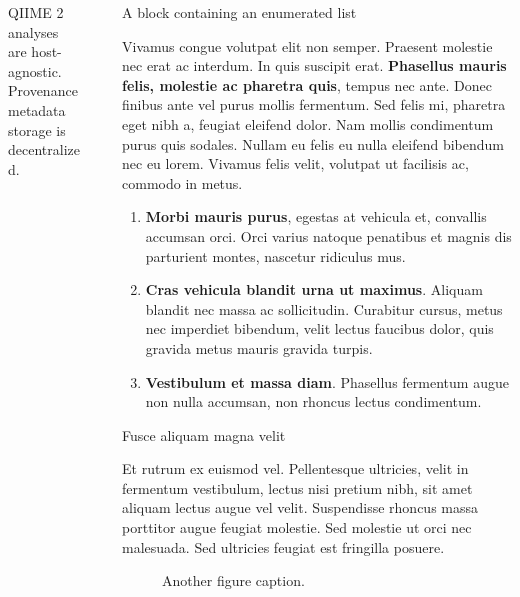 \documentclass[final]{beamer}
\newlength{\sepwidth}
\newlength{\colwidth}
\newcommand{\separatorcolumn}{\begin{column}{\sepwidth}\end{column}}
\begin{document}
\begin{frame}[t]
\begin{columns}[t]
\begin{column}{\colwidth}
\begin{block}{QIIME 2 analyses are host-agnostic. Provenance metadata storage is decentralized.}
  \end{block}

\end{column}

\separatorcolumn

\begin{column}{\colwidth}

  \begin{block}{A block containing an enumerated list}

    Vivamus congue volutpat elit non semper. Praesent molestie nec erat ac
    interdum. In quis suscipit erat. \textbf{Phasellus mauris felis, molestie
    ac pharetra quis}, tempus nec ante. Donec finibus ante vel purus mollis
    fermentum. Sed felis mi, pharetra eget nibh a, feugiat eleifend dolor. Nam
    mollis condimentum purus quis sodales. Nullam eu felis eu nulla eleifend
    bibendum nec eu lorem. Vivamus felis velit, volutpat ut facilisis ac,
    commodo in metus.

    \begin{enumerate}
      \item \textbf{Morbi mauris purus}, egestas at vehicula et, convallis
        accumsan orci. Orci varius natoque penatibus et magnis dis parturient
        montes, nascetur ridiculus mus.
      \item \textbf{Cras vehicula blandit urna ut maximus}. Aliquam blandit nec
        massa ac sollicitudin. Curabitur cursus, metus nec imperdiet bibendum,
        velit lectus faucibus dolor, quis gravida metus mauris gravida turpis.
      \item \textbf{Vestibulum et massa diam}. Phasellus fermentum augue non
        nulla accumsan, non rhoncus lectus condimentum.
    \end{enumerate}

  \end{block}

  \begin{block}{Fusce aliquam magna velit}

    Et rutrum ex euismod vel. Pellentesque ultricies, velit in fermentum
    vestibulum, lectus nisi pretium nibh, sit amet aliquam lectus augue vel
    velit. Suspendisse rhoncus massa porttitor augue feugiat molestie. Sed
    molestie ut orci nec malesuada. Sed ultricies feugiat est fringilla
    posuere.

    \begin{figure}
      \centering
      \caption{Another figure caption.}
    \end{figure}


\end{block}
\end{column}
\end{columns}
\end{frame}
\end{document}
